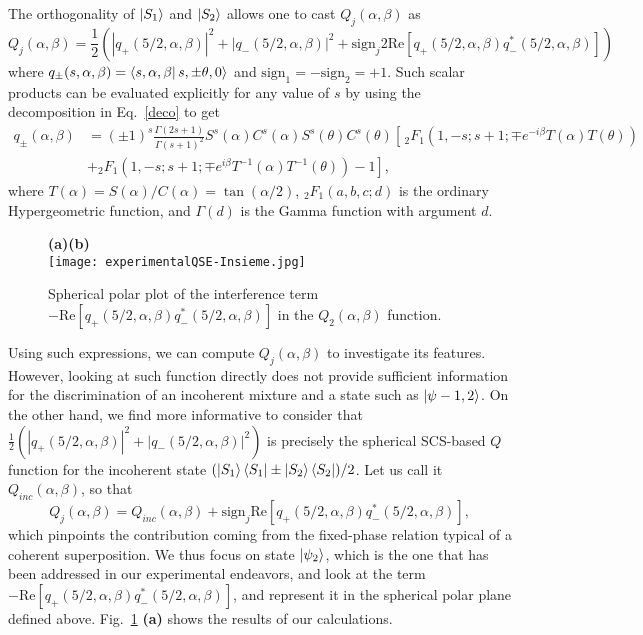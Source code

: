 The orthogonality of $\ket{S_1}$ and $\ket{S_2}$ allows one to cast $Q_j(\alpha,\beta)$ as 
\begin{equation}
Q_j(\alpha,\beta)=\frac12\left(|q_+(5/2,\alpha,\beta)|^2+|q_-(5/2,\alpha,\beta)|^2+\text{sign}_j2\text{Re}[q_+(5/2,\alpha,\beta)q^*_-(5/2,\alpha,\beta)]\right)
\end{equation}
where $q_\pm(s,\alpha,\beta)=\bra{s,\alpha,\beta}{s,\pm\theta,0}\rangle$ and $\text{sign}_1=-\text{sign}_2=+1$. Such scalar products can be evaluated explicitly for any value of $s$ by using the decomposition in Eq.~\eqref{deco} to get 
\begin{equation}
\begin{aligned}
q_\pm(\alpha,\beta)&=(\pm 1)^s\frac{\Gamma (2 s+1)}{\Gamma (s+1)^2} S^s\left({\alpha }\right) C^s\left(\alpha\right) S^s\left(\theta\right) C^s\left({\theta
   }\right) \left[\, _2F_1\left(1,-s;s+1;\mp e^{-i \beta  } T\left({\alpha}\right) T\left({\theta }\right)\right)\right.\\
  &+\left.{}_2F_1\left(1,-s;s+1;\mp e^{i \beta} T^{-1} \left({\alpha}\right) T^{-1}\left({\theta }\right)\right)-1\right],
  \end{aligned}
\end{equation}
where $T(\alpha)=S(\alpha)/C(\alpha)=\tan(\alpha/2)$, $_2F_1(a,b,c;d)$ is the ordinary Hypergeometric function, and $\Gamma(d)$ is the Gamma function with argument $d$. 
\begin{figure}[!t]
    \centering
    {\bf (a)}\hskip8cm{\bf (b)}\\
    \texttt{[image: experimentalQSE-Insieme.jpg]}
    \caption{Spherical polar plot of the interference term $-\text{Re}[q_+(5/2,\alpha,\beta)q^*_-(5/2,\alpha,\beta)]$ in the $Q_2(\alpha,\beta)$ function.}
    \label{insieme}
\end{figure}

Using such expressions, we can compute $Q_j(\alpha,\beta)$ to investigate its features. However, looking at such function directly does not provide sufficient information for the discrimination of an incoherent mixture and a state such as $\ket{\psi-{1,2}}$. On the other hand, we find more informative to consider that $\frac12\left(|q_+(5/2,\alpha,\beta)|^2+|q_-(5/2,\alpha,\beta)|^2\right)$ is precisely the spherical SCS-based $Q$ function for the incoherent state $(\ket{S_1}\bra{S_1}\pm\ket{S_2}\bra{S_2})/2$. Let us call it $Q_{inc}(\alpha,\beta)$, so that 
\begin{equation}
Q_j(\alpha,\beta)=Q_{inc}(\alpha,\beta)+\text{sign}_j\text{Re}[q_+(5/2,\alpha,\beta)q^*_-(5/2,\alpha,\beta)],
\end{equation}
which pinpoints the contribution coming from the fixed-phase relation typical of a coherent superposition. We thus focus on state $\ket{\psi_2}$, which is the one that has been addressed in our experimental endeavors, and look at the term $-\text{Re}[q_+(5/2,\alpha,\beta)q^*_-(5/2,\alpha,\beta)]$, and represent it in the spherical polar plane defined above. Fig.~\ref{insieme} {\bf (a)} shows the results of our calculations. 

